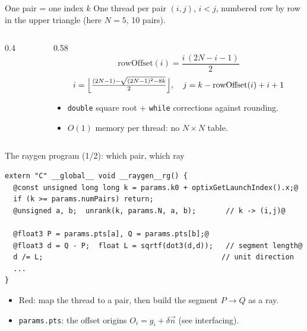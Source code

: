 \documentclass[aspectratio=169,10pt]{beamer}
\begin{document}
\begin{frame}{One pair = one index $k$}
  One thread per pair $(i,j)$, $i<j$, numbered row by row in the upper triangle (here $N=5$, 10 pairs).
  \begin{columns}[T]
    \begin{column}{0.4\textwidth}
    \end{column}
    \begin{column}{0.58\textwidth}
      \[ \text{rowOffset}(i)=\frac{i\,(2N-i-1)}{2} \]
      \[ i=\Bigl\lfloor \tfrac{(2N-1)-\sqrt{(2N-1)^2-8k}}{2}\Bigr\rfloor,\quad j=k-\text{rowOffset}(i)+i+1 \]
      \begin{itemize}
        \item \texttt{double} square root + \texttt{while} corrections against rounding.
        \item $O(1)$ memory per thread: no $N\times N$ table.
      \end{itemize}
    \end{column}
  \end{columns}
\end{frame}

\begin{frame}[fragile]{The raygen program (1/2): which pair, which ray}
\begin{lstlisting}
extern "C" __global__ void __raygen__rg() {
  @const unsigned long long k = params.k0 + optixGetLaunchIndex().x;@
  if (k >= params.numPairs) return;
  @unsigned a, b;  unrank(k, params.N, a, b);       // k -> (i,j)@

  @float3 P = params.pts[a], Q = params.pts[b];@
  @float3 d = Q - P;  float L = sqrtf(dot3(d,d));   // segment length@
  d /= L;                                          // unit direction
  ...
}
\end{lstlisting}
  \begin{itemize}
    \item Red: map the thread to a pair, then build the segment $P\to Q$ as a ray.
    \item \texttt{params.pts}: the offset origins $O_i=g_i+\delta\vec n$ (see interfacing).
  \end{itemize}
\end{frame}
\end{document}
